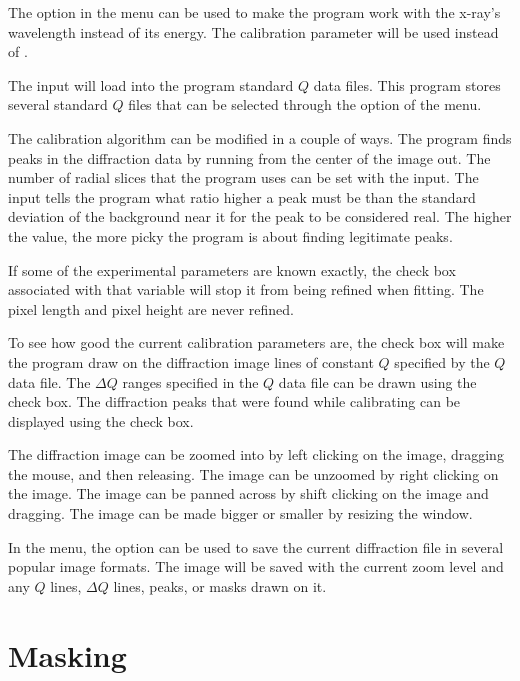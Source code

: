 The  option in the  menu can
be used to make the program work with the x-ray's
wavelength instead of its energy. The calibration parameter 
\gui{$\lambda$:} will be used instead of .

The  input will load into the program standard $Q$ data files. 
This program stores several standard $Q$ files that can be selected
through the  option of the  menu.

The calibration algorithm can be modified in a couple of ways.
The program finds peaks in the diffraction data by 
running from the center of the image out. 
The number of radial slices that the program uses
can be set with the  input.
The  input 
tells the program what ratio higher a peak must be than the 
standard deviation of the background near it for the
peak to be considered real. The higher the value, the more
picky the program is about finding legitimate peaks.

If some of the experimental parameters are known exactly, 
the  check box associated with that variable 
will stop it from being refined when fitting. The pixel 
length and pixel height are never refined. 

To see how good the current calibration parameters are, 
the  
check box will make the program draw 
on the diffraction image lines of constant $Q$ specified
by the $Q$ data file. The $\Delta Q$ ranges specified in 
the $Q$ data file can be drawn using the  
check box. The diffraction peaks that were found while
calibrating can be displayed using the  check box. 

The diffraction image can be zoomed into by left clicking
on the image, dragging the mouse, and then releasing.
The image can be unzoomed by right clicking on the image. 
The image can be panned across by shift clicking on the image 
and dragging. The image can be made bigger or smaller by 
resizing the window.

In the  menu, the  option can be used 
to save the current diffraction file in several popular
image formats. The image will be saved with the current
zoom level and any $Q$ lines, $\Delta Q$ lines, peaks, or
masks drawn on it.

\section{Masking}

